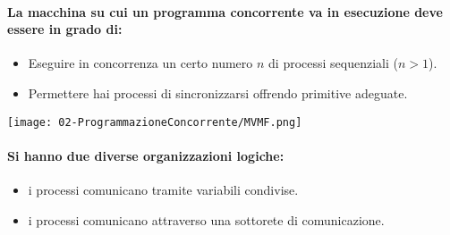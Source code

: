 \paragraph{La macchina su cui un programma concorrente va in esecuzione deve essere in grado di:} 

\begin{itemize}
  \item Eseguire in concorrenza un certo numero $n$ di processi sequenziali ($n>1$). 
  \item Permettere hai processi di sincronizzarsi offrendo primitive adeguate. 
\end{itemize}

\begin{center}
   \texttt{[image: 02-ProgrammazioneConcorrente/MVMF.png]}
\end{center}

\paragraph{Si hanno due diverse organizzazioni logiche:}

\begin{itemize}
  \item {} i processi comunicano tramite variabili condivise. 
  \item {} i processi comunicano attraverso una sottorete di comunicazione.
\end{itemize}









